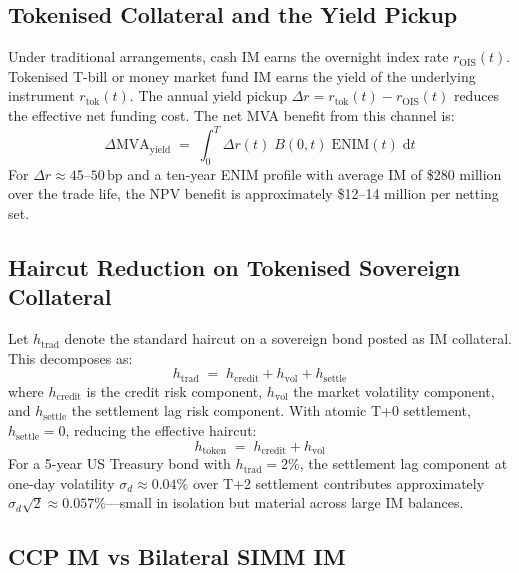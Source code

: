 \documentclass[12pt,letterpaper]{article}
\numberwithin{equation}{section}
\theoremstyle{remark}
\newcommand{\df}{B(0,t)}
\begin{document}
\subsection{Tokenised Collateral and the Yield Pickup}

Under traditional arrangements, cash IM earns the overnight index rate
$r_{\mathrm{OIS}}(t)$. Tokenised T-bill or money market fund IM earns
the yield of the underlying instrument $r_{\mathrm{tok}}(t)$. The
annual yield pickup $\Delta r = r_{\mathrm{tok}}(t) - r_{\mathrm{OIS}}(t)$
reduces the effective net funding cost. The net MVA benefit from this
channel is:
\begin{equation}
  \Delta\mathrm{MVA}_{\mathrm{yield}} \;=\;
  \int_0^T \Delta r(t)\;\df\;\mathrm{ENIM}(t)\;\mathrm{d}t
  \label{eq:mvayield}
\end{equation}
For $\Delta r \approx 45$--$50\,\mathrm{bp}$ and a ten-year ENIM profile
with average IM of \$280 million over the trade life, the NPV benefit
is approximately \$12--14 million per netting set.

\subsection{Haircut Reduction on Tokenised Sovereign Collateral}

Let $h_{\mathrm{trad}}$ denote the standard haircut on a sovereign bond
posted as IM collateral. This decomposes as:
\begin{equation}
  h_{\mathrm{trad}} \;=\; h_{\mathrm{credit}} + h_{\mathrm{vol}}
  + h_{\mathrm{settle}}
  \label{eq:haircut}
\end{equation}
where $h_{\mathrm{credit}}$ is the credit risk component, $h_{\mathrm{vol}}$
the market volatility component, and $h_{\mathrm{settle}}$ the settlement
lag risk component. With atomic T+0 settlement, $h_{\mathrm{settle}} = 0$,
reducing the effective haircut:
\begin{equation}
  h_{\mathrm{token}} \;=\; h_{\mathrm{credit}} + h_{\mathrm{vol}}
  \label{eq:haircuttoken}
\end{equation}
For a 5-year US Treasury bond with $h_{\mathrm{trad}} = 2\%$, the
settlement lag component at one-day volatility $\sigma_d \approx 0.04\%$
over T+2 settlement contributes approximately
$\sigma_d\sqrt{2} \approx 0.057\%$---small in isolation but material
across large IM balances.

\subsection{CCP IM vs Bilateral SIMM IM}
\end{document}
